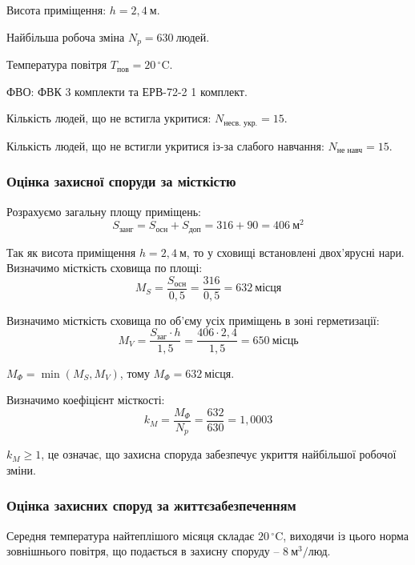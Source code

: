 \documentclass[a4paper,ukrainian,utf8,nocolumnsxix,floatsection,equationsection]{eskdtext}
\renewcommand\paragraph{\subsubsection}
\begin{document}
Висота приміщення: $h = 2,4\:\text{м}$.

Найбільша робоча зміна $N_p = 630\:\text{людей}$.

Температура повітря $T_{\text{пов}} = 20\,^{\circ}\mathrm{C}$.

ФВО: ФВК 3 комплекти та ЕРВ-72-2 1 комплект.

Кількість людей, що не встигла укритися: $N_{\text{несв. укр.}} = 15$.

Кількість людей, що не встигли укритися із-за слабого навчання: $N_{\text{не навч}} = 15$.

\paragraph{Оцінка захисної споруди за місткістю}

Розрахуємо загальну площу приміщень:
\begin{equation}
	S_{\text{занг}} = S_{\text{осн}} + S_{\text{доп}} = 316 + 90 = 406\:\text{м}^2
\end{equation}

Так як висота приміщення $h = 2,4\:\text{м}$, то у сховищі встановлені двох’ярусні нари. Визначимо місткість сховища по площі:
\begin{equation}
	M_S = \frac{S_{\text{осн}}}{0,5} = \frac{316}{0,5} = 632\:\text{місця}
\end{equation}


Визначимо місткість сховища по об’єму усіх приміщень в зоні герметизації:
\begin{equation}
	M_V = \frac{S_{\text{заг}} \cdot h}{1,5} = \frac{406 \cdot 2,4}{1,5} = 650\:\text{місць}
\end{equation}

$M_\Phi = \min(M_S, M_V)$, тому $M_\Phi = 632\:\text{місця}$.

Визначимо коефіцієнт місткості:
\begin{equation}
	k_M = \frac{M_\Phi}{N_p} = \frac{632}{630} = 1,0003
\end{equation}

$k_M \geq 1$, це означає, що захисна споруда забезпечує укриття найбільшої робочої зміни.

\paragraph{Оцінка захисних споруд за життєзабезпеченням}

Середня температура найтеплішого місяця складає $20\,^{\circ}\mathrm{C}$, виходячи із цього норма зовнішнього повітря, що подається в захисну споруду – $8\:\text{м}^3/\text{люд}$.
\end{document}
